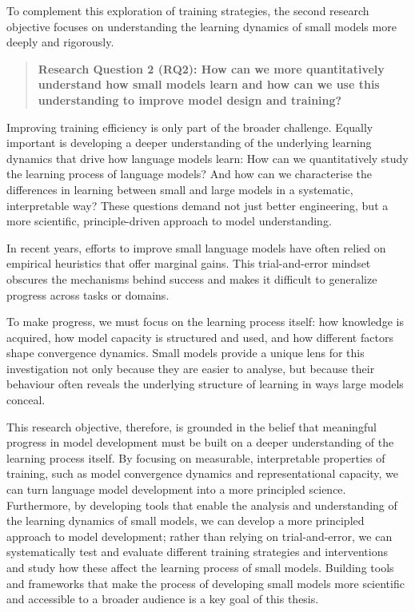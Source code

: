 To complement this exploration of training strategies, the second research objective focuses on understanding the learning dynamics of small models more deeply and rigorously.

\begin{quote}
    \textbf{Research Question 2 (RQ2): How can we more quantitatively understand how small models learn and how can we use this understanding to improve model design and training?}
\end{quote}

Improving training efficiency is only part of the broader challenge. Equally important is developing a deeper understanding of the underlying learning dynamics that drive how language models learn: How can we quantitatively study the learning process of language models? And how can we characterise the differences in learning between small and large models in a systematic, interpretable way? These questions demand not just better engineering, but a more scientific, principle-driven approach to model understanding.

In recent years, efforts to improve small language models have often relied on empirical heuristics that offer marginal gains. This trial-and-error mindset obscures the mechanisms behind success and makes it difficult to generalize progress across tasks or domains. 

To make progress, we must focus on the learning process itself: how knowledge is acquired, how model capacity is structured and used, and how different factors shape convergence dynamics. Small models provide a unique lens for this investigation not only because they are easier to analyse, but because their behaviour often reveals the underlying structure of learning in ways large models conceal.

This research objective, therefore, is grounded in the belief that meaningful progress in model development must be built on a deeper understanding of the learning process itself. By focusing on measurable, interpretable properties of training, such as model convergence dynamics and representational capacity, we can turn language model development into a more principled science. Furthermore, by developing tools that enable the analysis and understanding of the learning dynamics of small models, we can develop a more principled approach to model development; rather than relying on trial-and-error, we can systematically test and evaluate different training strategies and interventions and study how these affect the learning process of small models. Building tools and frameworks that make the process of developing small models more scientific and accessible to a broader audience is a key goal of this thesis.

